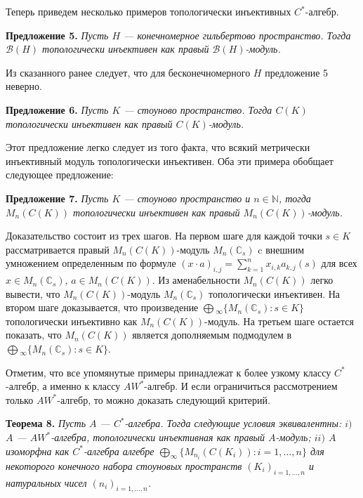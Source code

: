 \documentclass[12pt]{article}
\begin{document}
Теперь приведем несколько примеров топологически инъективных $C^*$-алгебр.

\medskip
\textbf{Предложение 5.} \textit{Пусть $H$ --- конечномерное гильбертово пространство. Тогда $\mathcal{B}(H)$ топологически инъективен как правый $\mathcal{B}(H)$-модуль.}

\medskip
Из сказанного ранее следует, что для бесконечномерного $H$ предложение 5 неверно.

\medskip
\textbf{Предложение 6.} \textit{Пусть $K$ --- стоуново пространство. Тогда $C(K)$ топологически инъективен как правый $C(K)$-модуль.}

\medskip
Этот предложение легко следует из того факта, что всякий метрически инъективный модуль топологически инъективен. Оба эти примера обобщает следующее предложение:

\medskip
\textbf{Предложение 7.} \textit{Пусть $K$ --- стоуново пространство и $n\in\mathbb{N}$, тогда $M_n(C(K))$ топологически инъективен как правый $M_n(C(K))$-модуль.}

\medskip
Доказательство состоит из трех шагов. На первом шаге для каждой точки $s\in K$ рассматривается правый $M_n(C(K))$-модуль $M_n(\mathbb{C}_s)$ c внешним умножением определенным по формуле $(x\cdot a)_{i,j}=\sum_{k=1}^n x_{i,k}a_{k,j}(s)$ для всех $x\in M_n(\mathbb{C}_s)$, $a\in M_n(C(K))$. Из аменабельности $M_n(C(K))$ легко вывести, что $M_n(C(K))$-модуль $M_n(\mathbb{C}_s)$ топологически инъективен. На втором шаге доказывается, что произведение $\bigoplus{}_\infty\{M_n(\mathbb{C}_s):s\in K\}$ топологически инъективно как $M_n(C(K))$-модуль. На третьем шаге остается показать, что $M_n(C(K))$ является дополняемым подмодулем в $\bigoplus{}_\infty\{M_n(\mathbb{C}_s):s\in K\}$.

Отметим, что все упомянутые примеры принадлежат к более узкому классу $C^*$-алгебр, а именно к классу $AW^*$-алгебр. И если ограничиться рассмотрением только $AW^*$-алгебр, то можно доказать следующий критерий.

\medskip
\textbf{Теорема 8.} \textit{Пусть $A$ --- $C^*$-алгебра. Тогда следующие условия эквивалентны:
\newline
$i)$ $A$ --- $AW^*$-алгебра, топологически инъективная как правый $A$-модуль;
\newline
$ii)$ $A$ изоморфна как $C^*$-алгебра алгебре $\bigoplus_\infty\{M_{n_i}(C(K_i)):i=1,\ldots,n\}$ для некоторого конечного набора стоуновых пространств $(K_i)_{i=1,\ldots,n}$ и натуральных чисел $(n_i)_{i=1,\ldots,n}$.}
\end{document}

